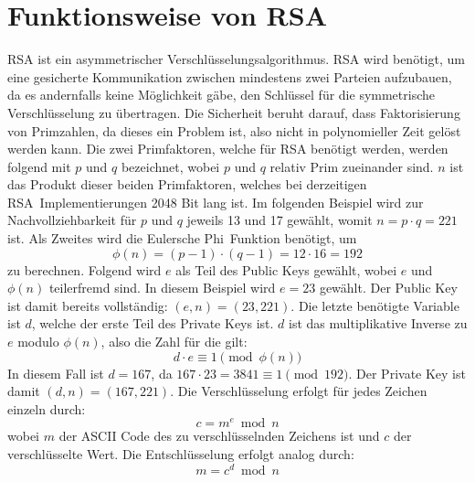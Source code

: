 \section{Funktionsweise von RSA}
RSA ist ein asymmetrischer Verschlüsselungsalgorithmus.
RSA wird benötigt, um eine gesicherte Kommunikation zwischen mindestens zwei Parteien aufzubauen, da 
es andernfalls keine Möglichkeit gäbe, den Schlüssel für die symmetrische Verschlüsselung  zu übertragen.
Die Sicherheit beruht darauf, dass Faktorisierung von Primzahlen, da dieses ein  Problem ist\cite{moolchad_leveraging_nodate},
also nicht in polynomieller Zeit gelöst werden kann. Die zwei Primfaktoren, welche für RSA benötigt werden, 
werden folgend mit $p$ und $q$ bezeichnet, wobei $p$ und $q$ relativ Prim zueinander sind. 
$n$ ist das Produkt dieser beiden Primfaktoren, welches bei derzeitigen RSA\textendash\ Implementierungen 
2048 Bit lang ist. Im folgenden Beispiel wird zur Nachvollziehbarkeit für $p$ und $q$ jeweils 13 und 17 gewählt, womit
$n = p \cdot q = 221$ ist. Als Zweites wird die Eulersche Phi\textendash\ Funktion benötigt, um 
\[
\phi(n) = (p-1) \cdot (q-1) = 12 \cdot 16 = 192
\]
zu berechnen. Folgend wird $e$ als Teil des Public Keys gewählt, wobei $e$ und $\phi(n)$ teilerfremd sind. In diesem 
Beispiel wird $e = 23$ gewählt. Der Public Key ist damit bereits vollständig: $(e, n) = (23, 221)$. Die letzte benötigte
Variable ist $d$, welche der erste Teil des Private Keys ist. $d$ ist das multiplikative Inverse zu $e$ modulo $\phi(n)$,
also die Zahl für die gilt:
\[
d \cdot e \equiv 1 \pmod{\phi(n)}
\]
In diesem Fall ist $d = 167$, da $167 \cdot 23 = 3841 \equiv 1 \pmod{192}$. Der Private Key ist damit $(d, n) = (167, 221)$.
Die Verschlüsselung erfolgt für jedes Zeichen einzeln durch:
\[
c = m^e \bmod n
\]
wobei $m$ der ASCII Code des zu verschlüsselnden Zeichens ist und $c$ der verschlüsselte Wert.
Die Entschlüsselung erfolgt analog durch:
\[
m = c^d \bmod n
\]



